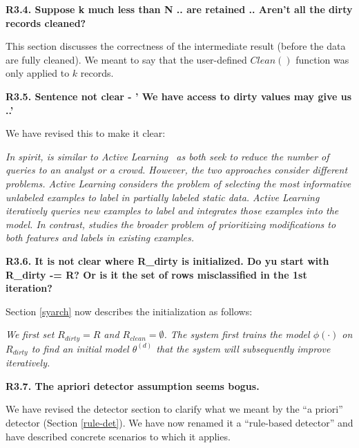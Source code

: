\noindent \textbf{R3.4. Suppose k much less than N .. are retained .. Aren't all
the dirty records cleaned?}

\noindent This section discusses the correctness of the intermediate result (before the data are fully cleaned).
We meant to say that the user-defined $Clean()$ function was only applied to $k$ records.

\vspace{0.5em}

\noindent\textbf{R3.5. Sentence not clear - ' We have access to dirty
values may give us ..'}

 \noindent We have revised this to make it clear:

\emph{In spirit, \sys is similar to Active Learning~\cite{DBLP:journals/pvldb/YakoutENOI11,gokhale2014corleone} as both seek to reduce the number of queries to an analyst or a crowd.
However, the two approaches consider different problems.
Active Learning considers the problem of selecting the most informative unlabeled examples to label in partially labeled static data.
Active Learning iteratively queries new examples to label and integrates those examples into the model.
In contrast, \sys studies the broader problem of prioritizing modifications to both features and labels in existing examples.} 

\vspace{0.5em}

\noindent\textbf{R3.6. It is not clear where R\_dirty is initialized. Do yu start with R\_dirty -= R? Or is it the set of rows misclassified in the 1st iteration?}

\noindent Section \ref{syarch} now describes the initialization as follows:

\emph{We first set $R_{dirty} = R$ and $R_{clean} = \emptyset$.
The system first trains the model $\phi(\cdot)$ on $R_{dirty}$ to find an initial model $\theta^{(d)}$ that the system will subsequently improve iteratively.}

\vspace{0.5em}

\noindent\textbf{R3.7. The apriori detector assumption seems bogus.} 

\noindent  We have revised the detector section to clarify what we meant by the ``a priori'' detector (Section \ref{rule-det}). We have now renamed it a ``rule-based detector'' and have described concrete scenarios to which it applies.

\vspace{0.5em}

